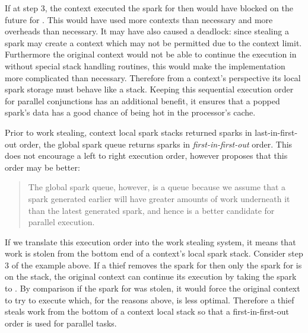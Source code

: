 If at step 3,
the context executed the spark for  then
 would have blocked on the future for .
This would have used more contexts than necessary and more overheads than
necessary.
It may have also caused a deadlock:
since stealing a spark may create a context which may not be permitted due
to the context limit.
Furthermore
the original context would not be able to continue the execution in 
without special stack handling routines,
this would make the implementation more complicated than necessary.
Therefore from a context's perspective its local spark storage must behave
like a stack.
Keeping this sequential execution order for parallel conjunctions has
an additional benefit,
it ensures that a popped spark's data has a good chance of being hot in the
processor's cache.

Prior to work stealing,
context local spark stacks returned sparks in last-in-first-out
order,
the global spark queue returns sparks in \emph{first-in-first-out} order.
This does not encourage a left to right execution order,
however \citet{wang:2006:hons} proposes that this order may be better:

\begin{quote}
The global spark queue, however, is a queue because we assume that a
spark generated earlier will have greater amounts of work underneath it
than the latest generated spark, and hence is a better candidate for
parallel execution.
\end{quote}

\noindent
If we translate this execution order into the work stealing system,
it means that work is stolen from the bottom end of a context's local spark
stack.
Consider step 3 of the example above.
If a thief removes the spark for 
then only the spark for  is on the stack,
the original context can continue its execution by taking the spark to
.
By comparison if the spark for  was stolen,
it would force the original context to try to execute 
which, for the reasons above, is less optimal.
Therefore a thief steals work from the bottom of a context local stack
so that a first-in-first-out order is used for parallel tasks.

